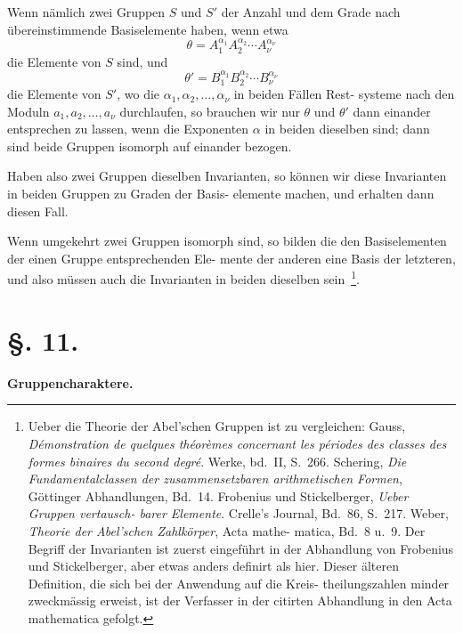 \documentclass[12pt,a4paper]{article}
\theoremstyle{plain}
\theoremstyle{definition}
\theoremstyle{remark}
\begin{document}
Wenn nämlich zwei Gruppen $S$ und $S'$ der Anzahl und dem
Grade nach übereinstimmende Basiselemente haben, wenn etwa
\[
\theta = A_1^{\alpha_1} A_2^{\alpha_2} \cdots A_\nu^{\alpha_\nu}
\]
die Elemente von $S$ sind, und
\[
\theta' = B_1^{\alpha_1} B_2^{\alpha_2} \cdots B_\nu^{\alpha_\nu}
\]
die Elemente von $S'$, wo die $\alpha_1, \alpha_2, \ldots, \alpha_\nu$ in beiden Fällen Rest-
systeme nach den Moduln $a_1, a_2, \ldots, a_\nu$ durchlaufen, so brauchen
wir nur $\theta$ und $\theta'$ dann einander entsprechen zu lassen, wenn
die Exponenten $\alpha$ in beiden dieselben sind; dann sind beide
Gruppen isomorph auf einander bezogen.

Haben also zwei Gruppen dieselben Invarianten, so können
wir diese Invarianten in beiden Gruppen zu Graden der Basis-
elemente machen, und erhalten dann diesen Fall.

Wenn umgekehrt zwei Gruppen isomorph sind, so bilden
die den Basiselementen der einen Gruppe entsprechenden Ele-
mente der anderen eine Basis der letzteren, und also müssen
auch die Invarianten in beiden dieselben sein~\footnote{%
Ueber die Theorie der Abel'schen Gruppen ist zu vergleichen:
\newline
Gauss, \textit{Démonstration de quelques théorèmes concernant les
périodes des classes des formes binaires du second degré}. Werke,
bd.~II, S.~266.
\newline
Schering, \textit{Die Fundamentalclassen der zusammensetzbaren
arithmetischen Formen}, Göttinger Abhandlungen, Bd.~14.
\newline
Frobenius und Stickelberger, \textit{Ueber Gruppen vertausch-
barer Elemente}. Crelle's Journal, Bd.~86, S.~217.
\newline
Weber, \textit{Theorie der Abel'schen Zahlkörper}, Acta mathe-
matica, Bd.~8 u.~9.
\newline\newline
Der Begriff der Invarianten ist zuerst eingeführt in der Abhandlung
von Frobenius und Stickelberger, aber etwas anders definirt als
hier. Dieser älteren Definition, die sich bei der Anwendung auf die Kreis-
theilungszahlen minder zweckmässig erweist, ist der Verfasser in der
citirten Abhandlung in den Acta mathematica gefolgt.}.


\section*{\S. 11.}
\begin{center}
\textbf{Gruppencharaktere.}
\end{center}
\end{document}
